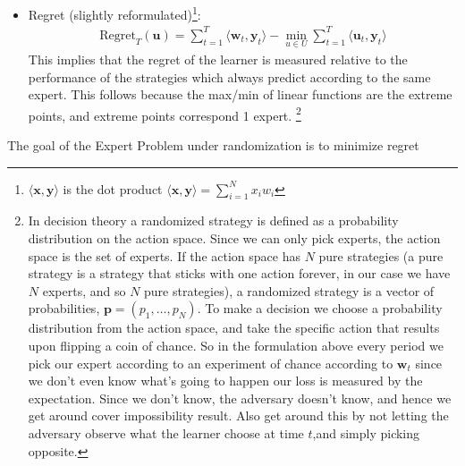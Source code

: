 \documentclass[11pt]{article}
\theoremstyle{quest}
\begin{document}
\begin{tcolorbox}
\begin{itemize}
	\item Regret (slightly reformulated)\footnote{$\langle \mathbf{x}, \mathbf{y}\rangle$ is the dot product $\langle \mathbf{x}, \mathbf{y} \rangle = \sum_{i=1}^N x_i w_i$}:  
	\begin{align*} \text{Regret}_T(\mathbf{u})= \sum_{t=1}^T \langle \mathbf{w}_t, \mathbf{y}_t\rangle - \min_{u \in U}\sum_{t=1}^T  \langle \mathbf{u}_t, \mathbf{y}_t\rangle \end{align*}
	This implies that the regret of the learner is measured relative to the performance of the strategies which always predict according to the same expert. This follows because the max/min of linear functions are the extreme points, and extreme points correspond 1 expert. \footnote{In decision theory a randomized strategy is defined as a probability distribution on the action space. Since we can only pick experts, the action space is the set of experts.  If the action space has $N$ pure strategies (a pure strategy is a strategy that sticks with one action forever, in our case we have $N$ experts, and so $N$ pure strategies), a randomized strategy  is a vector of probabilities, $\mathbf{p}=(p_1,\dots, p_N)$. To make a decision we choose a probability distribution from the action space, and take the specific action that results upon flipping a coin of chance. So in the formulation above every period we pick our expert according to an experiment of chance according to $\mathbf{w}_t$ since we don't even know what's going to happen our loss is measured by the expectation. Since we don't know, the adversary doesn't know, and hence we get around cover impossibility result. Also get around this by not letting the adversary observe what the learner choose at time $t$,and simply picking opposite.  }
\end{itemize}

The goal of the Expert Problem under randomization is to minimize regret
\end{tcolorbox}
\end{document}

